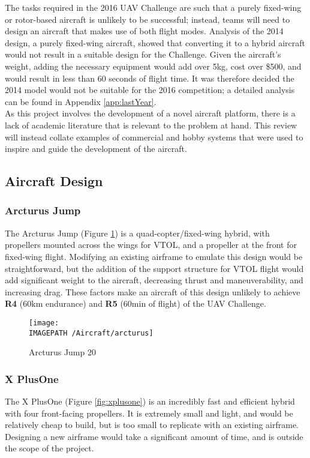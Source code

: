 The tasks required in the 2016 UAV Challenge are such that a purely fixed-wing or rotor-based aircraft is unlikely to be successful; instead, teams will need to design an aircraft that makes use of both flight modes. Analysis of the 2014 design, a purely fixed-wing aircraft, showed that converting it to a hybrid aircraft would not result in a suitable design for the Challenge. Given the aircraft's weight, adding the necessary equipment would add over 5kg, cost over \$500, and would result in less than 60 seconds of flight time. It was therefore decided the 2014 model would not be suitable for the 2016 competition; a detailed analysis can be found in Appendix \ref{app:lastYear}.\\

As this project involves the development of a novel aircraft platform, there is a lack of academic literature that is relevant to the problem at hand. This review will instead collate examples of commercial and hobby systems that were used to inspire and guide the development of the aircraft.\\

\subsection{Aircraft Design}
\subsubsection*{Arcturus Jump}
The Arcturus Jump\cite{ref:arcturus} (Figure \ref{fig:arcturus}) is a quad-copter/fixed-wing hybrid, with propellers mounted across the wings for VTOL, and a propeller at the front for fixed-wing flight. Modifying an existing airframe to emulate this design would be straightforward, but the addition of the support structure for VTOL flight would add significant weight to the aircraft, decreasing thrust and maneuverability, and increasing drag. These factors make an aircraft of this design unlikely to achieve \textbf{R4} (60km endurance) and \textbf{R5} (60min of flight) of the UAV Challenge.

\begin{figure}[!h]
	\centering
	\texttt{[image: \\IMAGEPATH /Aircraft/arcturus]}
	\caption{Arcturus Jump 20}
	\label{fig:arcturus}
\end{figure}

\subsubsection*{X PlusOne}
The X PlusOne\cite{ref:xplusone} (Figure \ref{fig:xplusone}) is an incredibly fast and efficient hybrid with four front-facing propellers. It is extremely small and light, and would be relatively cheap to build, but is too small to replicate with an existing airframe. Designing a new airframe would take a significant amount of time, and is outside the scope of the project.

